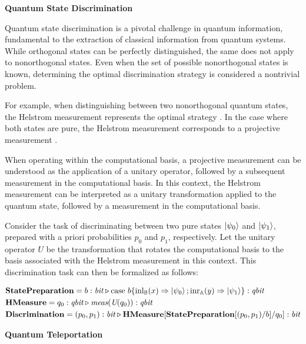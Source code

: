 \documentclass[10pt,a4paper]{amsart}
\theoremstyle{definition}
\theoremstyle{definition}
\theoremstyle{definition}
\theoremstyle{definition}
\theoremstyle{definition}
\theoremstyle{definition}
\begin{document}
    \textbf{Quantum State Discrimination}


Quantum state discrimination is a pivotal challenge in quantum information, fundamental to the extraction of classical information from quantum systems. While orthogonal states can be perfectly distinguished, the same does not apply to nonorthogonal states. 
Even when the set of possible nonorthogonal states is known, determining the optimal discrimination strategy is considered a nontrivial problem.

For example, when distinguishing between two nonorthogonal quantum states, the Helstrom measurement represents the optimal strategy \cite{helstromQuantumDetectionEstimation1976}. In the case where both states are pure, the Helstrom measurement corresponds to a projective measurement \cite{barnett2009quantum}.

When operating within the computational basis, a projective measurement can be understood as the application of a unitary operator, followed by a subsequent measurement in the computational basis. In this context, the Helstrom measurement can be interpreted as a unitary transformation applied to the quantum state, followed by a measurement in the computational basis. 

Consider the task of discriminating between two pure states $\ket{\psi_0}$ and $\ket{\psi_1}$, prepared with a priori probabilities $p_0$ and $p_1$, respectively. Let the unitary operator $U$  be the transformation that rotates the computational basis to the basis associated with the Helstrom measurement  in this context. This discrimination task can then be formalized as follows:

\begin{align*}
  &\textbf{StatePreparation} =  b:\textit{bit}  \triangleright  \text{case } b \{\text{inl}_{\mathbb{B}}(x) \Rightarrow \ket{\psi_0} ; \text{inr}_{\mathbb{A}}(y) \Rightarrow \ket{\psi_1}\}: \textit{qbit} \\
  &\textbf{HMeasure} =  q_0: \textit{qbit} \triangleright \textit{meas} (\textit{U}(q_0))  : \textit{qbit} \\
  &\textbf{Discrimination} = (p_0,p_1): \textit{bit}  \triangleright \textbf{HMeasure} [ \textbf{StatePreparation} [(p_0,p_1)/ b] / q_0] : \textit{bit}
\end{align*}



\vspace{10pt}



    \textbf{ Quantum Teleportation}
\end{document}
